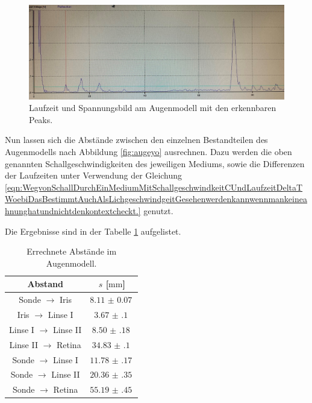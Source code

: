 \begin{figure}
    \centering
    \includegraphics[width=\textwidth]{bilder/auge1.jpg}
    \caption{Laufzeit und Spannungsbild am Augenmodell mit den erkennbaren Peaks.} 
    \label{fig:augewtf}
\end{figure}
\FloatBarrier
\begin{flushleft}
Nun lassen sich die Abstände zwischen den einzelnen Bestandteilen des Augenmodells nach Abbildung \ref{fig:augeyo} ausrechnen. Dazu werden die oben genannten Schallgeschwindigkeiten des jeweiligen Mediums, sowie die Differenzen der Laufzeiten unter Verwendung der 
Gleichung \eqref{eqn:WegvonSchallDurchEinMediumMitSchallgeschwindkeitCUndLaufzeitDeltaTWoebiDasBestimmtAuchAlsLichgeschwindgeitGesehenwerdenkannwennmankeineahnunghatundnichtdenkontextcheckt.} genutzt.
\end{flushleft}
Die Ergebnisse sind in der Tabelle \ref{tab:4} aufgelistet.
\begin{table}
    \centering
    \caption{Errechnete Abstände im Augenmodell.}
    \label{tab:4}
    \begin{tabular}{c c}
        \toprule
        Abstand & $s$ [$\si{\milli\meter}$]  \\
        \midrule
        Sonde $\to$ Iris  &$\SI{8.11(7)}{}$\\
        Iris $\to$ Linse I  &$\SI{3.67(10)}{}$\\
        Linse I $\to$ Linse II &$\SI{8.50(18)}{}$\\
        Linse II $\to$ Retina &$\SI{34.83(10)}{}$\\
        \midrule
        Sonde $\to$ Linse I& $\SI{11.78(17)}{}$\\
        Sonde $\to$ Linse II& $\SI{20.36(35)}{}$\\
        Sonde $\to$ Retina& $\SI{55.19(45)}{}$\\    
    \end{tabular}
\end{table}


